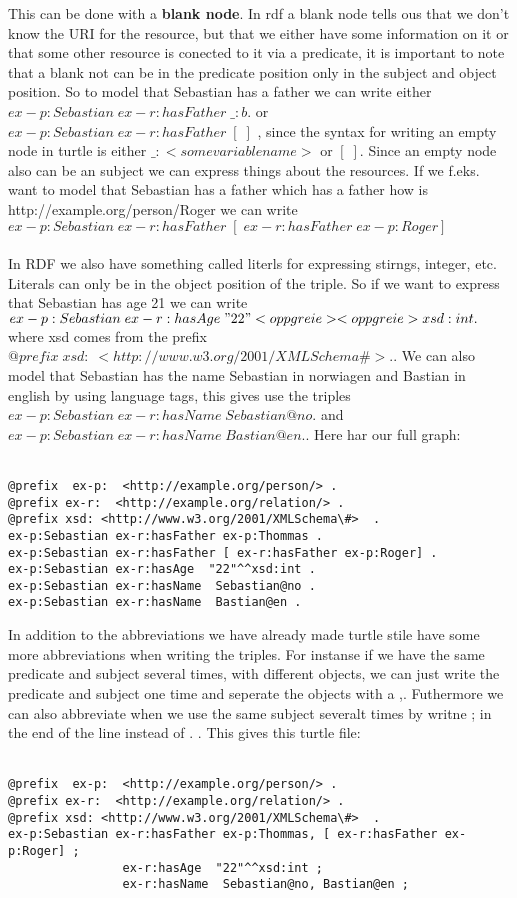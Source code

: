 This can be done with a \textbf{blank node}. In rdf a blank node tells ous that we don't know the URI for the resource, but that we either have some information 
on it or that some other resource is conected to it via a predicate, it is important to note that a blank not can be in the predicate position only in the subject and object
position. So to model that Sebastian has a father we can write either $ex-p:Sebastian\; ex-r:hasFather\; \_:b .$ or $ex-p:Sebastian\; ex-r:hasFather\; [\; ]$ , since the syntax 
for writing an empty node in turtle is either $\_:<some variable name>$ or $[\; ]$. Since an empty node also can be an subject we can express things about the resources. If we 
f.eks. want to model that Sebastian has a father which has a father how is http://example.org/person/Roger we can write $ex-p:Sebastian\; ex-r:hasFather\; [\; ex-r:hasFather\; ex-p:Roger]$
\\ \\ 
In RDF we also have something called literls for expressing stirngs, integer, etc. Literals can only be in the object position of the triple. 
So if we want to express that Sebastian has age 21 we can write $ex-p:Sebastian\; ex-r:hasAge\; " 22 " <opp greie> <opp greie> xsd:int.$ where xsd comes from the prefix
$@prefix\; xsd:\; <http://www.w3.org/2001/XMLSchema\#> .$. We can also model that Sebastian has the name Sebastian in norwiagen and Bastian in english by using 
language tags, this gives use the triples $ex-p:Sebastian\; ex-r:hasName\; Sebastian@no.$ and $ex-p:Sebastian\; ex-r:hasName\; Bastian@en.$. Here har our full 
graph:
\\ \\

\begin{lstlisting}[frame=single, language=turtle]
@prefix  ex-p:  <http://example.org/person/> . 
@prefix ex-r:  <http://example.org/relation/> . 
@prefix xsd: <http://www.w3.org/2001/XMLSchema\#>  . 
ex-p:Sebastian ex-r:hasFather ex-p:Thommas .
ex-p:Sebastian ex-r:hasFather [ ex-r:hasFather ex-p:Roger] . 
ex-p:Sebastian ex-r:hasAge  "22"^^xsd:int . 
ex-p:Sebastian ex-r:hasName  Sebastian@no . 
ex-p:Sebastian ex-r:hasName  Bastian@en .
\end{lstlisting}
In addition to the abbreviations we have already made turtle stile have some more abbreviations when writing the triples. For instanse if we have the same 
predicate and subject several times, with different objects, we can just write the predicate and subject one time and seperate the objects with a ,. Futhermore 
we can also abbreviate when we use the same subject severalt times by writne ; in the end of the line instead of . . This gives this turtle file:
\\ \\
\begin{lstlisting}[frame=single, language=turtle]
@prefix  ex-p:  <http://example.org/person/> . 
@prefix ex-r:  <http://example.org/relation/> . 
@prefix xsd: <http://www.w3.org/2001/XMLSchema\#>  . 
ex-p:Sebastian ex-r:hasFather ex-p:Thommas, [ ex-r:hasFather ex-p:Roger] ; 
                ex-r:hasAge  "22"^^xsd:int ; 
                ex-r:hasName  Sebastian@no, Bastian@en ;
\end{lstlisting}

